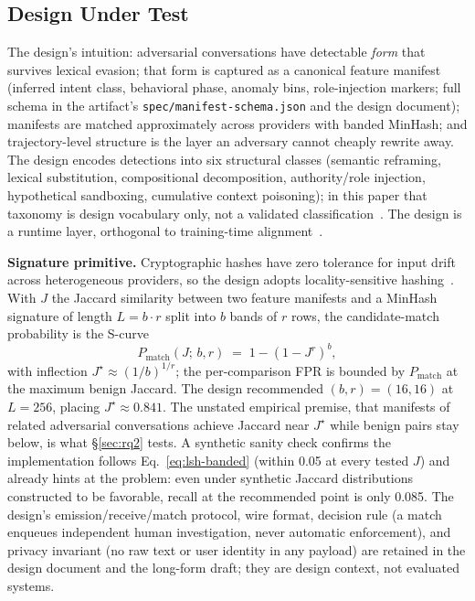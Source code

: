 \documentclass[letterpaper,twocolumn,10pt]{article}
\begin{document}
\subsection{Design Under Test}
\label{sec:design}
The design's intuition: adversarial conversations have detectable
\emph{form} that survives lexical evasion; that form is captured as a
canonical feature manifest (inferred intent class, behavioral phase, anomaly
bins, role-injection markers; full schema in the artifact's
\texttt{spec/manifest-schema.json} and the design document); manifests are
matched approximately across providers with banded MinHash; and
trajectory-level structure is the layer an adversary cannot cheaply rewrite
away. The design encodes detections into six structural classes (semantic
reframing, lexical substitution, compositional decomposition, authority/role
injection, hypothetical sandboxing, cumulative context poisoning); in this
paper that taxonomy is design vocabulary only, not a validated
classification~\cite{medredteam2026}. The design is a runtime layer,
orthogonal to training-time
alignment~\cite{opencharacter2025,inoculation2025}.

\textbf{Signature primitive.} Cryptographic hashes have zero tolerance for
input drift across heterogeneous providers, so the design adopts
locality-sensitive hashing~\cite{broder1997}. With $J$ the Jaccard
similarity between two feature manifests and a MinHash signature of length
$L = b\cdot r$ split into $b$ bands of $r$ rows, the candidate-match
probability is the S-curve
\begin{equation}
P_{\text{match}}(J;\, b, r) \;=\; 1 - (1 - J^{r})^{b},
\label{eq:lsh-banded}
\end{equation}
with inflection $J^\star \approx (1/b)^{1/r}$; the per-comparison FPR is
bounded by $P_{\text{match}}$ at the maximum benign Jaccard. The design
recommended $(b,r) = (16,16)$ at $L = 256$, placing $J^\star \approx 0.841$.
The unstated empirical premise, that manifests of related adversarial
conversations achieve Jaccard near $J^\star$ while benign pairs stay below,
is what \S\ref{sec:rq2} tests. A synthetic sanity check confirms the
implementation follows Eq.~\eqref{eq:lsh-banded} (within 0.05 at every
tested $J$) and already hints at the problem: even under synthetic Jaccard
distributions constructed to be favorable, recall at the recommended point
is only 0.085. The design's emission/receive/match protocol, wire format,
decision rule (a match enqueues independent human investigation, never
automatic enforcement), and privacy invariant (no raw text or user identity
in any payload) are retained in the design document and the long-form
draft; they are design context, not evaluated systems.
\end{document}
